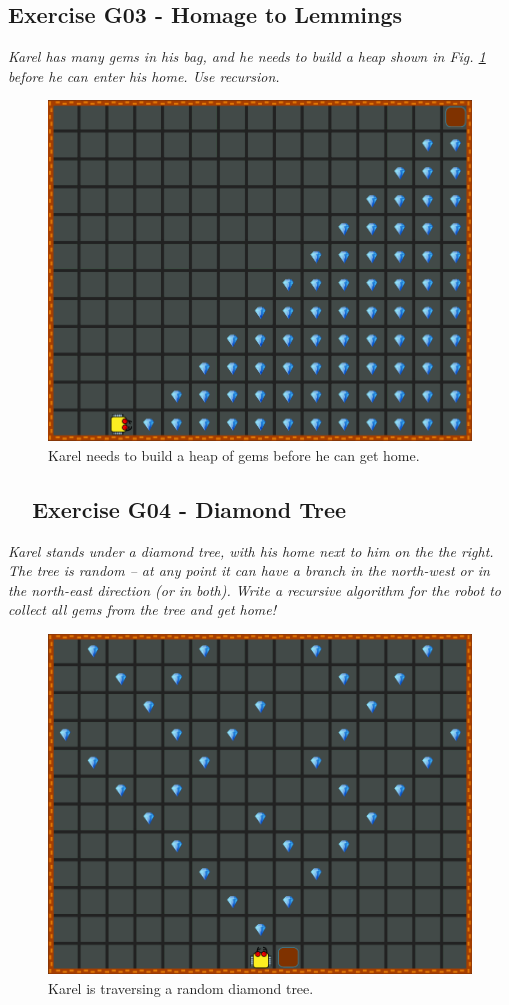 {{{{\subsection{Exercise G03 - Homage to Lemmings}

{\em  Karel has many gems in his bag, and he needs to build a heap shown in Fig. \ref{fig:g03} before he can 
enter his home. Use recursion.}\\[-7mm]

\begin{figure}[!ht]
\begin{center}
\includegraphics[height=0.4\textwidth]{imgk/g03.png}
\end{center}
\vspace{-4mm}
\caption{Karel needs to build a heap of gems before he can get home.}
\label{fig:g03}
\vspace{-1cm}
\end{figure}
\newpage
\noindent

\subsection{\ \ Exercise G04 - Diamond Tree}

{\em Karel stands under a diamond tree, with his home next to him on the the right. 
The tree is random -- at any point it can have 
a branch in the north-west or in the north-east direction (or in both). Write a recursive 
algorithm for the robot to collect all gems from the tree and get home!  }

\begin{figure}[!ht]
\begin{center}
\includegraphics[height=0.4\textwidth]{imgk/g04.png}
\end{center}
\vspace{-4mm}
\caption{Karel is traversing a random diamond tree.}
\label{fig:g04}
\vspace{-4mm}
\end{figure}
\noindent


}}}}

